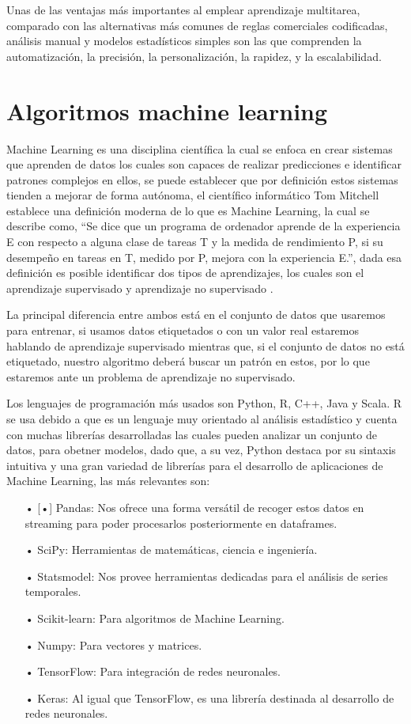 Unas de las ventajas más importantes al emplear aprendizaje multitarea, comparado con las alternativas más comunes de reglas comerciales codificadas, análisis manual y modelos estadísticos simples son las que comprenden la automatización, la precisión, la personalización, la rapidez, y la escalabilidad.


\section{Algoritmos machine learning}

Machine Learning es una disciplina científica la cual se enfoca en crear sistemas que aprenden de datos los cuales son capaces de realizar predicciones e identificar patrones complejos en ellos, se puede establecer que por definición estos sistemas tienden a mejorar de forma autónoma, el científico informático Tom Mitchell establece una definición moderna de lo que es Machine Learning, la cual se describe como, “Se dice que un programa de ordenador aprende de la experiencia E con respecto a alguna clase de tareas T y la medida de rendimiento P, si su desempeño en tareas en T, medido por P, mejora con la experiencia E.”, dada esa definición es posible identificar dos tipos de aprendizajes, los cuales son el aprendizaje supervisado y aprendizaje no supervisado \cite{RodriguezGonzalez2018}. 

La principal diferencia entre ambos está en el conjunto de datos que usaremos para entrenar, si usamos datos etiquetados o con un valor real estaremos hablando de aprendizaje supervisado mientras que, si el conjunto de datos no está etiquetado, nuestro algoritmo deberá buscar un patrón en estos, por lo que estaremos ante un problema de aprendizaje no supervisado.

Los lenguajes de programación más usados son Python, R, C++, Java y Scala. R se usa debido a que es un lenguaje muy orientado al análisis estadístico y cuenta con muchas librerías desarrolladas las cuales pueden analizar un conjunto de datos, para obetner modelos, dado que, a su vez, Python destaca por su sintaxis intuitiva y una gran variedad de librerías para el desarrollo de aplicaciones de Machine Learning, las más relevantes son: 

\begin{itemize}
\item[•][•] Pandas: Nos ofrece una forma versátil de recoger estos datos en streaming para poder procesarlos posteriormente en dataframes.
\item[•] SciPy: Herramientas de matemáticas, ciencia e ingeniería. 
\item[•] Statsmodel: Nos provee herramientas dedicadas para el análisis de series temporales.
\item[•] Scikit-learn: Para algoritmos de Machine Learning. 
\item[•] Numpy: Para vectores y matrices. 
\item[•] TensorFlow: Para integración de redes neuronales. 
\item[•] Keras: Al igual que TensorFlow, es una librería destinada al desarrollo de redes neuronales.
\end{itemize}

